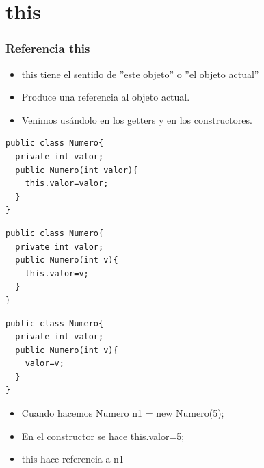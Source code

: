 \documentclass{beamer}
\begin{document}
\section{this}

\begin{frame}[fragile]
\frametitle{Referencia this}
\begin{itemize}[<+->]


\item \alert{this} tiene el sentido de ''este objeto'' o ''el objeto actual''
\item Produce una referencia al objeto actual.
\item Venimos usándolo en los getters y en los constructores.
\end{itemize}
\begin{tiny}
\begin{multicols}{3}
\begin{verbatim}
public class Numero{
  private int valor;
  public Numero(int valor){
    this.valor=valor;
  }
}
\end{verbatim}
\begin{verbatim}
public class Numero{
  private int valor;
  public Numero(int v){
    this.valor=v;
  }
}
\end{verbatim}
\begin{verbatim}
public class Numero{
  private int valor;
  public Numero(int v){
    valor=v;
  }
}
\end{verbatim}
\end{multicols}
\end{tiny}
\begin{itemize}[<+->]
\item Cuando hacemos Numero n1 = new Numero(5);
\item En el constructor se hace this.valor=5;
\item \alert{this} hace referencia a \alert{n1}
\end{itemize}
\end{frame}
\end{document}
